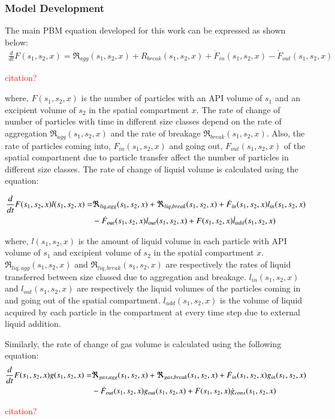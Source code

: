 \documentclass[preprint,11pt,authoryear]{elsarticle}
\begin{document}
	    \subsubsection{Model Development}
	    \par The main PBM equation developed for this work can be expressed as shown below:
	    \begin{align}
	    \frac{d}{dt}F(s_1,s_2,x)=\Re_{agg}(s_1,s_2,x)+R_{break}(s_1,s_2,x)+\dot{F}_{in}(s_1,s_2,x)-\dot{F}_{out}(s_1,s_2,x)
	    \label{eqn:mthds_pbm_overall} 
	    \end{align}
	    \par \textcolor{red}{citation?}    
	    
	    \par where, $F(s_1,s_2,x)$ is the number of particles with an API volume of $s_1$ and an excipient volume of $s_2$ in the spatial compartment $x$. The rate of change of number of particles with time in different size classes depend on the rate of aggregation $\Re_{agg}(s_1,s_2,x)$ and the rate of breakage $\Re_{break}(s_1,s_2,x)$. Also, the rate of particles coming into, $F_{in}(s_1,s_2,x)$ and going out, $F_{out}(s_1,s_2,x)$ of the spatial compartment due to particle transfer affect the number of particles in different size classes. 
	The rate of change of liquid volume is calculated using the equation: 
	
	    \begin{align}
	    \frac{d}{dt}F(s_1,s_2,x)l(s_1,s_2,x)=& \Re_{liq,agg}(s_1,s_2,x)+\Re_{liq,break}(s_1,s_2,x)+\dot{F}_{in}(s_1,s_2,x)l_{in}(s_1,s_2,x)\notag\\
	    &-\dot{F}_{out}(s_1,s_2,x)l_{out}(s_1,s_2,x)+F(s_1,s_2,x)\dot{l}_{add}(s_1,s_2,x)
	    \end{align}
	    
	    \par where, $l(s_1,s_2,x)$ is the amount of liquid volume in each particle with API volume of $s_1$ and excipient volume of $s_2$ in the spatial compartment $x$. $\Re_{liq,agg}(s_1,s_2,x)$ and $\Re_{liq,break}(s_1,s_2,x)$ are respectively the rates of liquid transferred between size classed due to aggregation and breakage. $l_{in}(s_1,s_2,x)$ and $l_{out}(s_1,s_2,x)$ are respectively the liquid volumes of the particles coming in and going out of the spatial compartment. $l_{add}(s_1,s_2,x)$ is the volume of liquid acquired by each particle in the compartment at every time step due to external liquid addition. 
	    \par Similarly, the rate of change of gas volume is calculated using the following equation: 
	    \begin{align}
	    \frac{d}{dt}F(s_1,s_2,x)g(s_1,s_2,x)=& \Re_{gas,agg}(s_1,s_2,x)+\Re_{gas,break}(s_1,s_2,x)+\dot{F}_{in}(s_1,s_2,x)g_{in}(s_1,s_2,x)\notag\\
	    &-\dot{F}_{out}(s_1,s_2,x)g_{out}(s_1,s_2,x)+F(s_1,s_2,x)\dot{g}_{cons}(s_1,s_2,x)
	    \end{align}
	    \par \textcolor{red}{citation?}
	    
\end{document}
